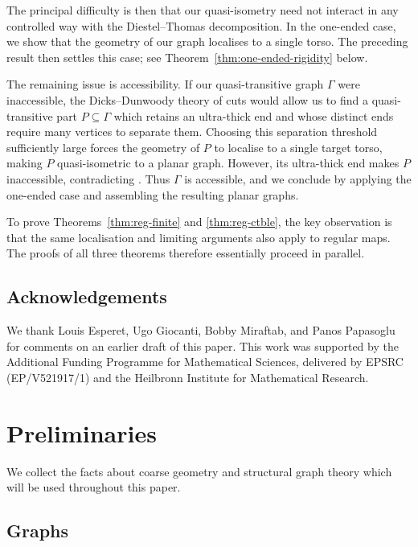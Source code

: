 \documentclass[10pt,a4paper]{amsart}
\theoremstyle{definition}
\begin{document}
The principal difficulty is then that our quasi-isometry need not interact in any controlled way with the Diestel--Thomas decomposition. In the one-ended case, we show that the geometry of our graph localises to a single torso. The preceding result then settles this case; see Theorem~\ref{thm:one-ended-rigidity} below.

The remaining issue is accessibility. If our quasi-transitive graph $\Gamma$ were inaccessible, the Dicks--Dunwoody theory of cuts \cite{dicks1989groups} would allow us to find a quasi-transitive part $P \subseteq \Gamma$ which retains an ultra-thick end and whose distinct ends require many vertices to separate them. Choosing this separation threshold sufficiently large forces the geometry of $P$ to localise to a single target torso, making $P$ quasi-isometric to a planar graph. However, its ultra-thick end makes $P$ inaccessible, contradicting \cite[Thm.~A]{macmanus2023accessibility}. Thus $\Gamma$ is accessible, and we conclude by applying the one-ended case and assembling the resulting planar graphs.

To prove Theorems~\ref{thm:reg-finite} and \ref{thm:reg-ctble}, the key observation is that the same localisation and limiting arguments also apply to regular maps. The proofs of all three theorems therefore essentially proceed in parallel.  




\subsection*{Acknowledgements}

We thank Louis Esperet, Ugo Giocanti, Bobby Miraftab, and Panos Papasoglu for comments on an earlier draft of this paper. 
This work was supported by the Additional Funding Programme for Mathematical Sciences, delivered by EPSRC (EP/V521917/1) and the Heilbronn Institute for Mathematical Research.



\section{Preliminaries}\label{sec:preliminaries}

We collect the facts about coarse geometry and structural graph theory which will be used throughout this paper.

\subsection{Graphs}
\end{document}
